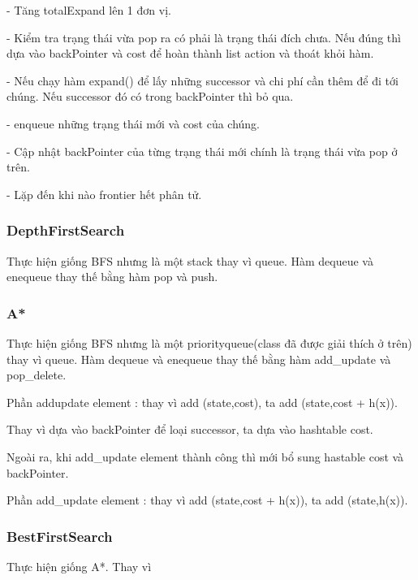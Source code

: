 \documentclass[11pt]{scrartcl} %
\begin{document}
- Tăng totalExpand lên 1 đơn vị.  

- Kiểm tra trạng thái vừa pop ra có phải là trạng thái đích chưa. Nếu đúng thì dựa vào backPointer và cost để hoàn thành list action và thoát khỏi hàm.  

- Nếu chạy hàm expand() để lấy những successor và chi phí cần thêm để đi tới chúng. Nếu successor đó có trong backPointer thì bỏ qua.

- enqueue những trạng thái mới và cost của chúng.

- Cập nhật backPointer của từng trạng thái mới chính là trạng thái vừa pop ở trên.

- Lặp đến khi nào frontier hết phân tử.

\subsubsection{DepthFirstSearch}

Thực hiện giống BFS nhưng  là một stack thay vì queue. Hàm dequeue và enequeue thay thế bằng hàm pop và push.

\subsubsection{A*}
Thực hiện giống BFS nhưng  là một priorityqueue(class đã được giải thích ở trên) thay vì queue. Hàm dequeue và enequeue thay thế bằng hàm add_update và pop_delete.

Phần addupdate element : thay vì add (state,cost), ta add (state,cost + h(x)).

Thay vì dựa vào backPointer để loại successor, ta dựa vào hashtable cost.

Ngoài ra, khi add_update element thành công thì mới bổ sung hastable cost và backPointer.

Phần add_update element : thay vì add (state,cost + h(x)), ta add (state,h(x)).

\subsubsection{BestFirstSearch}
Thực hiện giống A*.
Thay vì



\end{document}
